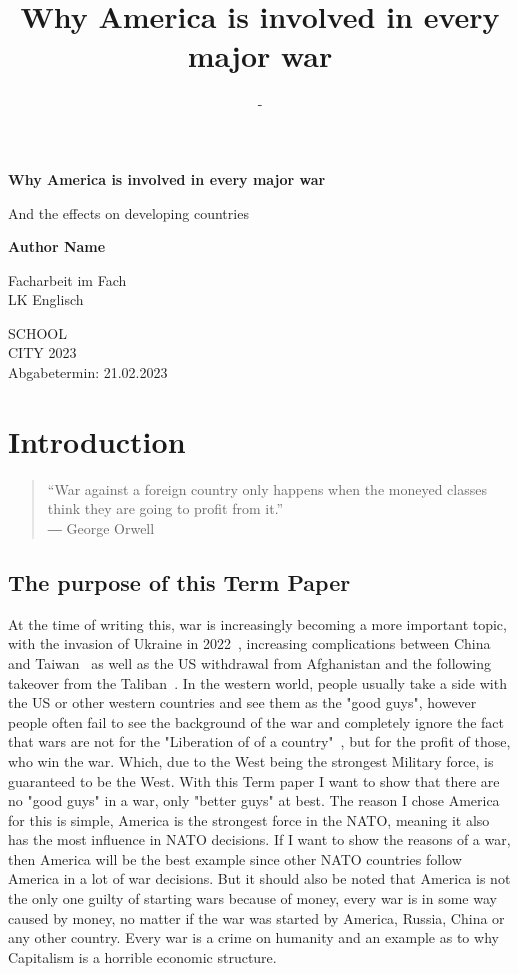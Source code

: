 \documentclass[12pt,a4paper]{article}
\title{Why America is involved in every major war}
\author{-}
\begin{document}
	\begin{center}
		{
		\vspace*{1cm}
		
		\Huge
		\textbf{Why America is involved in every major war}
		
		\vspace{0.5cm}
		\LARGE
		And the effects on developing countries
		
		\vspace{1.5cm}
		
		\textbf{Author Name}
		
		\vspace{1.5cm}
		
		Facharbeit im Fach\\
		LK Englisch
		
		\vfill
		\Large
		SCHOOL\\
		CITY 2023\\
		Abgabetermin: 21.02.2023
		}
	\end{center}
	\clearpage
	\newpage
	\tableofcontents
	\newpage
	\section{Introduction}
		\begin{quote}
		“War against a foreign country only happens when the moneyed classes think they are going to profit from it.”\\
		― George Orwell~\cite{orwell-quote}
		\end{quote}
		\subsection{The purpose of this Term Paper}
		At the time of writing this, war is increasingly becoming a more important topic, with the invasion of Ukraine in 2022~\cite{bbc-invasion-ukraine}, increasing complications between China and Taiwan~\cite{bbc-china-taiwan} as well as the US withdrawal from Afghanistan and the following takeover from the Taliban~\cite{cfr-afghanistan}.
		In the western world, people usually take a side with the US or other western countries and see them as the "good guys", however people often fail to see the background of the war and completely ignore the fact that  wars are not for the "Liberation of of a country"~\cite{george-bush-liberation-iraq}, but for the profit of those, who win the war. Which, due to the West being the strongest Military force, is guaranteed to be the West.
		With this Term paper I want to show that there are no "good guys" in a war, only "better guys" at best.
		The reason I chose America for this is simple, America is the strongest force in the NATO\cite{statista-nato-aircraft-strength}, meaning it also has the most influence in NATO decisions. If I want to show the reasons of a war, then America will be the best example since other NATO countries follow America in a lot of war decisions.
		But it should also be noted that America is not the only one guilty of starting wars because of money, every war is in some way caused by money, no matter if the war was started by America, Russia, China or any other country. Every war is a crime on humanity and an example as to why Capitalism is a horrible economic structure.
\end{document}
